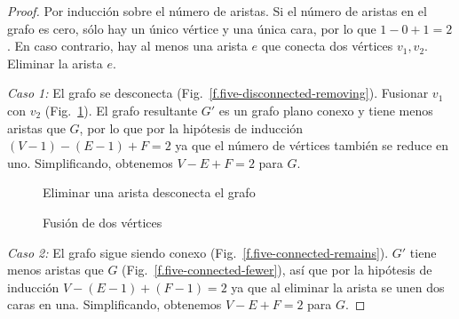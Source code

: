 \begin{proof}
Por inducción sobre el número de aristas. Si el número de aristas en el grafo es cero, sólo hay un único vértice y una única cara, por lo que $1-0+1=2$. En caso contrario, hay al menos una arista $e$ que conecta dos vértices $v_1,v_2$. Eliminar la arista $e$.

\textit{Caso 1:}
El grafo se desconecta (Fig.~\ref{f.five-disconnected-removing}). Fusionar $v_1$ con $v_2$ (Fig.~\ref{f.five-disconnected-merge}). El grafo resultante $G'$ es un grafo plano conexo y tiene menos aristas que $G$, por lo que por la hipótesis de inducción $(V-1)-(E-1)+F=2$ ya que el número de vértices también se reduce en uno. Simplificando, obtenemos $V-E+F=2$ para $G$.

\begin{figure}[ht]
\begin{minipage}{.45\textwidth}
\begin{center}
\caption{Eliminar una arista desconecta el grafo}\label{f.five-disconnected-removing}
\end{center}
\end{minipage}
\hfill
\begin{minipage}{.45\textwidth}
\begin{center}
\caption{Fusión de dos vértices}\label{f.five-disconnected-merge}
\end{center}
\end{minipage}
\end{figure}

\textit{Caso 2:}
El grafo sigue siendo conexo (Fig.~\ref{f.five-connected-remains}). $G'$ tiene menos aristas que $G$ (Fig.~\ref{f.five-connected-fewer}), así que por la hipótesis de inducción $V-(E-1)+(F-1)=2$ ya que al eliminar la arista se unen dos caras en una. Simplificando, obtenemos $V-E+F=2$ para $G$.
\end{proof}

